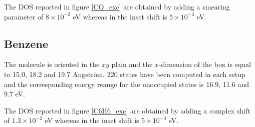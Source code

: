 \documentclass[reprint,aps,prb]{revtex4-1}
\renewcommand{\AA}{{Angstr\"om}}
\begin{document}
The DOS reported in figure \ref{CO_exc} are obtained by adding a smearing parameter of $8\times 10^{-2}$ eV whereas in the inset shift is $5\times 10^{-3}$ eV. 

\subsection{Benzene}
The molecule is oriented in the $xy$ plain and the $x$-dimension of the box is equal to 15.0, 18.2 and 19.7 \AA.
220 states have been computed in each setup and the corresponding
energy reange for the unoccupied states is 16.9, 11.6 and 9.7 eV.  

The DOS reported in figure \ref{C6H6_exc} are obtained by adding a complex shift of $1.3\times 10^{-2}$ eV whereas in the inset shift is $5\times 10^{-3}$ eV. 



%

\end{document}
